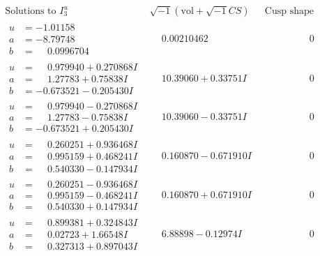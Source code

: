 \documentclass[1p]{elsarticle_modified}
\theoremstyle{definition}
\newcommand{\I}{\sqrt{-1}}
\begin{document}
$$\begin{array}{c|c|c}  
\text{Solutions to }I^u_{3}& \I (\text{vol} + \sqrt{-1}CS) & \text{Cusp shape}\\
 \hline 
\begin{aligned}
u &= -1.01158\phantom{ +0.000000I} \\
a &= -8.79748\phantom{ +0.000000I} \\
b &= \phantom{-}0.0996704\phantom{ +0.000000I}\end{aligned}
 & \phantom{-}0.00210462\phantom{ +0.000000I} & \phantom{-0.000000 } 0 \\ \hline\begin{aligned}
u &= \phantom{-}0.979940 + 0.270868 I \\
a &= \phantom{-}1.27783 + 0.75838 I \\
b &= -0.673521 - 0.205430 I\end{aligned}
 & \phantom{-}10.39060 + 0.33751 I & \phantom{-0.000000 } 0 \\ \hline\begin{aligned}
u &= \phantom{-}0.979940 - 0.270868 I \\
a &= \phantom{-}1.27783 - 0.75838 I \\
b &= -0.673521 + 0.205430 I\end{aligned}
 & \phantom{-}10.39060 - 0.33751 I & \phantom{-0.000000 } 0 \\ \hline\begin{aligned}
u &= \phantom{-}0.260251 + 0.936468 I \\
a &= \phantom{-}0.995159 + 0.468241 I \\
b &= \phantom{-}0.540330 - 0.147934 I\end{aligned}
 & \phantom{-}0.160870 - 0.671910 I & \phantom{-0.000000 } 0 \\ \hline\begin{aligned}
u &= \phantom{-}0.260251 - 0.936468 I \\
a &= \phantom{-}0.995159 - 0.468241 I \\
b &= \phantom{-}0.540330 + 0.147934 I\end{aligned}
 & \phantom{-}0.160870 + 0.671910 I & \phantom{-0.000000 } 0 \\ \hline\begin{aligned}
u &= \phantom{-}0.899381 + 0.324843 I \\
a &= \phantom{-}0.02723 + 1.66548 I \\
b &= \phantom{-}0.327313 + 0.897043 I\end{aligned}
 & \phantom{-}6.88898 - 0.12974 I & \phantom{-0.000000 } 0 \\ \hline\begin{aligned}

\end{aligned}
\end{array}$$
\end{document}
